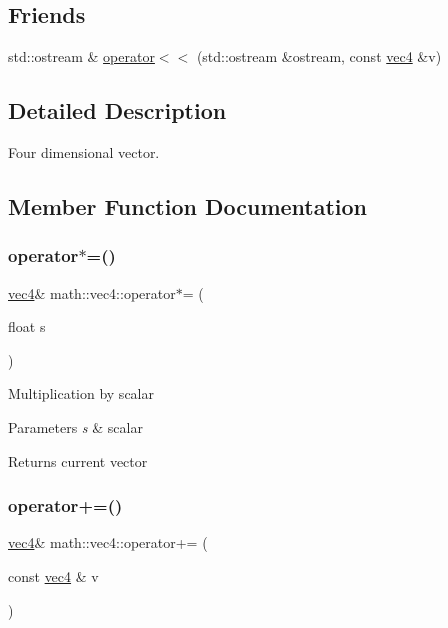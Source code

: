 \subsection*{Friends}
\begin{DoxyCompactItemize}
\item 
std\+::ostream \& \hyperlink{structmath_1_1vec4_a1926ce7e95f766e792f64c9d7cc6f3f2}{operator$<$$<$} (std\+::ostream \&ostream, const \hyperlink{structmath_1_1vec4}{vec4} \&v)
\end{DoxyCompactItemize}


\subsection{Detailed Description}
Four dimensional vector. 

\subsection{Member Function Documentation}
\mbox{\label{structmath_1_1vec4_a1308a1344a9c95b9e74ffe0cf991c3ca}} 
\subsubsection{\texorpdfstring{operator$\ast$=()}{operator*=()}}
{\footnotesize\ttfamily \hyperlink{structmath_1_1vec4}{vec4}\& math\+::vec4\+::operator$\ast$= (\begin{DoxyParamCaption}\item[{float}]{s }\end{DoxyParamCaption})\hspace{0.3cm}{\ttfamily [inline]}}

Multiplication by scalar 
\begin{DoxyParams}{Parameters}
{\em s} & scalar \\
\hline
\end{DoxyParams}
\begin{DoxyReturn}{Returns}
current vector 
\end{DoxyReturn}
\mbox{\label{structmath_1_1vec4_ac3c42d2c2cb0c72a7d53f86c9a16016e}} 
\subsubsection{\texorpdfstring{operator+=()}{operator+=()}}
{\footnotesize\ttfamily \hyperlink{structmath_1_1vec4}{vec4}\& math\+::vec4\+::operator+= (\begin{DoxyParamCaption}\item[{const \hyperlink{structmath_1_1vec4}{vec4} \&}]{v }\end{DoxyParamCaption})\hspace{0.3cm}{\ttfamily [inline]}}

